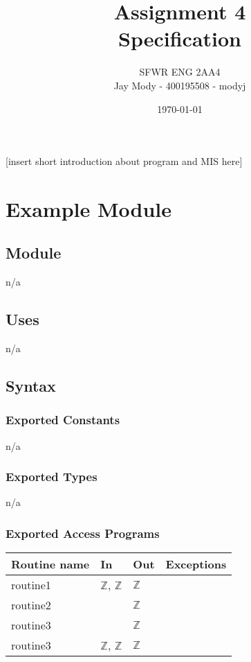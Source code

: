 \documentclass[12pt]{article}
\title{Assignment 4\\Specification}
\author{SFWR ENG 2AA4\\Jay Mody - 400195508 - modyj}
\date{\today}
\begin{document}
\maketitle



[insert short introduction about program and MIS here]


\newpage
\section* {Example Module}
\subsection*{Module}
n/a


\subsection* {Uses}
n/a


\subsection* {Syntax}
\subsubsection* {Exported Constants}
n/a

\subsubsection* {Exported Types}
n/a

\subsubsection* {Exported Access Programs}
\begin{tabular}{| l | l | l | l |}
\hline
\textbf{Routine name} & \textbf{In} & \textbf{Out} & \textbf{Exceptions}\\
\hline
routine1 & $\mathbb{Z}$, $\mathbb{Z}$ & $\mathbb{Z}$ & \\
\hline
routine2 & ~ & $\mathbb{Z}$ & ~\\
\hline
routine3 & ~ & $\mathbb{Z}$ & ~\\
\hline
routine3 & $\mathbb{Z}$, $\mathbb{Z}$ & $\mathbb{Z}$ & ~\\
\hline
\end{tabular}
\end{document}
